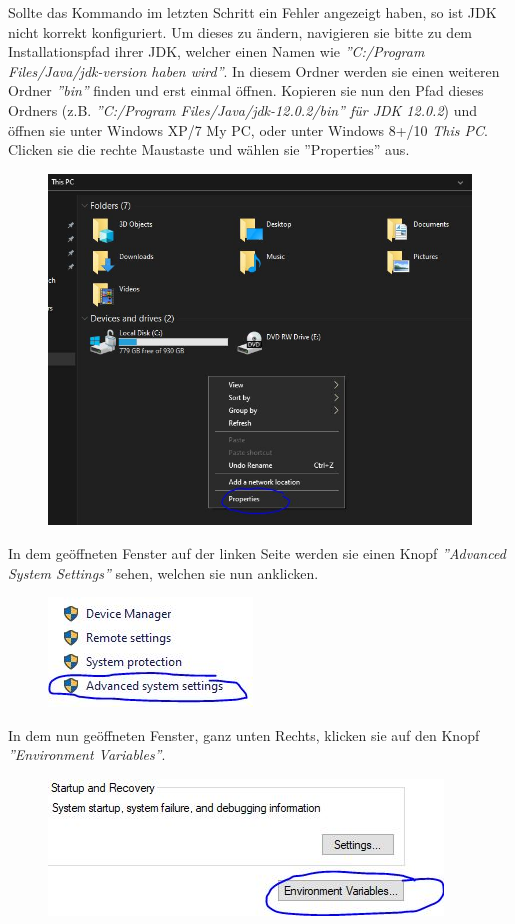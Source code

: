 \documentclass[fontsize=12pt,paper=a4,twoside]{scrartcl}
\begin{document}
Sollte das Kommando im letzten Schritt ein Fehler angezeigt haben, so ist JDK nicht korrekt konfiguriert. Um dieses zu ändern, navigieren sie bitte zu dem Installationspfad ihrer JDK, welcher einen Namen wie \textit{''C:/Program Files/Java/jdk-version haben wird''}. In diesem Ordner werden sie einen weiteren Ordner \textit{''bin''} finden und erst einmal öffnen. Kopieren sie nun den Pfad dieses Ordners (z.B. \textit{''C:/Program Files/Java/jdk-12.0.2/bin'' für JDK 12.0.2}) und öffnen sie unter Windows XP/7 My PC, oder unter Windows 8+/10 \textit{This PC}. Clicken sie die rechte Maustaste und wählen sie ''Properties'' aus.
\begin{figure}[h!]
\centering
\includegraphics[width=0.7\linewidth]{Properties.JPG}
\end{figure}

In dem geöffneten Fenster auf der linken Seite werden sie einen Knopf \textit{''Advanced System Settings''} sehen, welchen sie nun anklicken.
\begin{figure}[h!]
\centering
\includegraphics[width=0.5\linewidth]{AdvancedSystemSettings.JPG}
\end{figure}

\newpage
In dem nun geöffneten Fenster, ganz unten Rechts, klicken sie auf den Knopf \textit{''Environment Variables''}.
\begin{figure}[H]
\centering
\includegraphics[width=0.5\linewidth]{EnvironmentVariables.JPG}
\end{figure}
\end{document}
